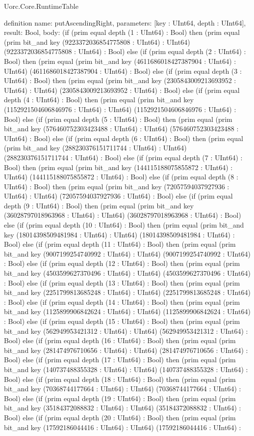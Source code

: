 \begin{lexlean}{Uorc.Core.RuntimeTable}
\begin{semanticmodule}
definition{
  name: putAscendingRight,
  parameters: [key : UInt64, depth : UInt64],
  result: Bool,
  body: (if (prim equal depth (1 : UInt64) : Bool) then (prim equal (prim bit_and key (9223372036854775808 : UInt64) : UInt64) (9223372036854775808 : UInt64) : Bool) else (if (prim equal depth (2 : UInt64) : Bool) then (prim equal (prim bit_and key (4611686018427387904 : UInt64) : UInt64) (4611686018427387904 : UInt64) : Bool) else (if (prim equal depth (3 : UInt64) : Bool) then (prim equal (prim bit_and key (2305843009213693952 : UInt64) : UInt64) (2305843009213693952 : UInt64) : Bool) else (if (prim equal depth (4 : UInt64) : Bool) then (prim equal (prim bit_and key (1152921504606846976 : UInt64) : UInt64) (1152921504606846976 : UInt64) : Bool) else (if (prim equal depth (5 : UInt64) : Bool) then (prim equal (prim bit_and key (576460752303423488 : UInt64) : UInt64) (576460752303423488 : UInt64) : Bool) else (if (prim equal depth (6 : UInt64) : Bool) then (prim equal (prim bit_and key (288230376151711744 : UInt64) : UInt64) (288230376151711744 : UInt64) : Bool) else (if (prim equal depth (7 : UInt64) : Bool) then (prim equal (prim bit_and key (144115188075855872 : UInt64) : UInt64) (144115188075855872 : UInt64) : Bool) else (if (prim equal depth (8 : UInt64) : Bool) then (prim equal (prim bit_and key (72057594037927936 : UInt64) : UInt64) (72057594037927936 : UInt64) : Bool) else (if (prim equal depth (9 : UInt64) : Bool) then (prim equal (prim bit_and key (36028797018963968 : UInt64) : UInt64) (36028797018963968 : UInt64) : Bool) else (if (prim equal depth (10 : UInt64) : Bool) then (prim equal (prim bit_and key (18014398509481984 : UInt64) : UInt64) (18014398509481984 : UInt64) : Bool) else (if (prim equal depth (11 : UInt64) : Bool) then (prim equal (prim bit_and key (9007199254740992 : UInt64) : UInt64) (9007199254740992 : UInt64) : Bool) else (if (prim equal depth (12 : UInt64) : Bool) then (prim equal (prim bit_and key (4503599627370496 : UInt64) : UInt64) (4503599627370496 : UInt64) : Bool) else (if (prim equal depth (13 : UInt64) : Bool) then (prim equal (prim bit_and key (2251799813685248 : UInt64) : UInt64) (2251799813685248 : UInt64) : Bool) else (if (prim equal depth (14 : UInt64) : Bool) then (prim equal (prim bit_and key (1125899906842624 : UInt64) : UInt64) (1125899906842624 : UInt64) : Bool) else (if (prim equal depth (15 : UInt64) : Bool) then (prim equal (prim bit_and key (562949953421312 : UInt64) : UInt64) (562949953421312 : UInt64) : Bool) else (if (prim equal depth (16 : UInt64) : Bool) then (prim equal (prim bit_and key (281474976710656 : UInt64) : UInt64) (281474976710656 : UInt64) : Bool) else (if (prim equal depth (17 : UInt64) : Bool) then (prim equal (prim bit_and key (140737488355328 : UInt64) : UInt64) (140737488355328 : UInt64) : Bool) else (if (prim equal depth (18 : UInt64) : Bool) then (prim equal (prim bit_and key (70368744177664 : UInt64) : UInt64) (70368744177664 : UInt64) : Bool) else (if (prim equal depth (19 : UInt64) : Bool) then (prim equal (prim bit_and key (35184372088832 : UInt64) : UInt64) (35184372088832 : UInt64) : Bool) else (if (prim equal depth (20 : UInt64) : Bool) then (prim equal (prim bit_and key (17592186044416 : UInt64) : UInt64) (17592186044416 : UInt64) : }
\end{semanticmodule}
\end{lexlean}
